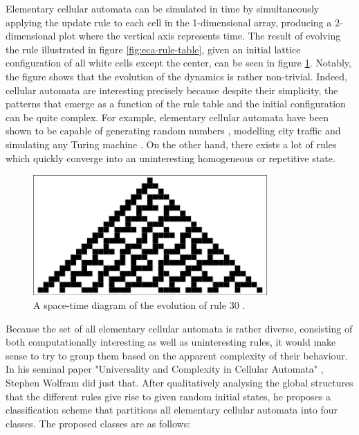 \documentclass[12pt]{article}
\begin{document}
Elementary cellular automata can be simulated in time by simultaneously applying the update rule to each cell in the 1-dimensional array, producing a 2-dimensional plot where the vertical axis represents time. The result of evolving the rule illustrated in figure \ref{fig:eca-rule-table}, given an initial lattice configuration of all white cells except the center, can be seen in figure \ref{fig:eca-rule-dynamics}. Notably, the figure shows that the evolution of the dynamics is rather non-trivial. Indeed, cellular automata are interesting precisely because despite their simplicity, the patterns that emerge as a function of the rule table and the initial configuration can be quite complex. For example, elementary cellular automata have been shown to be capable of generating random numbers \cite{eca-random-gen}, modelling city traffic \cite{eca-city-traffic} and simulating any Turing machine \cite{eca-universal}. On the other hand, there exists a lot of rules which quickly converge into an uninteresting homogeneous or repetitive state. 

\begin{figure} [!h]
\begin{center}
\includegraphics[width=0.8\textwidth]{eca-dynamics-example}
\caption{A space-time diagram of the evolution of rule 30 \cite{weisstein-eca}.}
\label{fig:eca-rule-dynamics}
\end{center}
\end{figure} 

Because the set of all elementary cellular automata is rather diverse, consisting of both computationally interesting as well as uninteresting rules, it would make sense to try to group them based on the apparent complexity of their behaviour. In his seminal paper "Universality and Complexity in Cellular Automata" \cite{wolfram-classification}, Stephen Wolfram did just that. After qualitatively analysing the global structures that the different rules give rise to given random initial states, he proposes a classification scheme that partitions all elementary cellular automata into four classes. The proposed classes are as follows:
\end{document}
